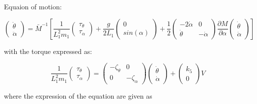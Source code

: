 
Equaion of motion:

\begin{equation}
\left( \begin{matrix}
        \ddot \theta \\
        \ddot \alpha
    \end{matrix} \right) = \bar M^{-1} \left[
\frac{1}{ L_1^2 m_1}
    \left( \begin{matrix}
        \tau_{\theta} \\
        \tau_{\alpha}
    \end{matrix} \right)
    +\frac{g}{2L_1}
    \left( \begin{matrix}
        0 \\
        sin( \alpha)
    \end{matrix} \right)
     + \frac{1}{2} \left( \begin{matrix}
    - 2 \dot \alpha & 0\\
        \dot \theta & -\dot \alpha
    \end{matrix} \right)
    \frac{\partial M}{\partial \alpha}
     \left( \begin{matrix}
        \dot \theta \\
        \dot \alpha
    \end{matrix} \right) \right]
\end{equation}

with the torque expressed as:

\begin{equation}
\frac{1}{ L_1^2 m_1}
    \left( \begin{matrix}
        \tau_{\theta} \\
        \tau_{\alpha}
    \end{matrix} \right)
    = \left( \begin{matrix}
        -\zeta_\theta & 0 \\ 0 & -\zeta_\alpha
    \end{matrix}\right)
    \left( \begin{matrix}
        \dot \theta \\ \dot \alpha
    \end{matrix}\right)
    +
    \left( \begin{matrix}
    k_5 \\ 0    
    \end{matrix}\right)
    V
\end{equation}

where the expression of the equation are given as
